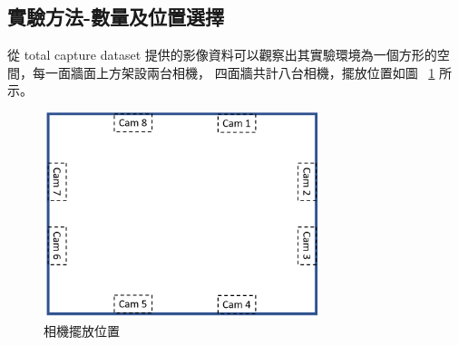 \subsection{實驗方法-數量及位置選擇}
從 total capture dataset 提供的影像資料可以觀察出其實驗環境為一個方形的空間，每一面牆面上方架設兩台相機，
四面牆共計八台相機，擺放位置如圖 ~\ref{ch3_fig_cameraset_totalcap} 所示。
\begin{figure}[!ht]
   \centering
   \includegraphics[width=8cm]{figure/ch3_fig_cameraset_totalcap.png}
    \caption[相機擺放位置]{相機擺放位置}
    \label{ch3_fig_cameraset_totalcap}
\end{figure}

